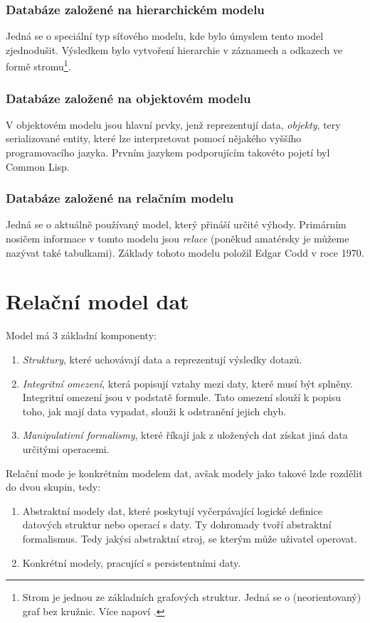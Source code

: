 \subsubsection{Databáze založené na hierarchickém modelu}
Jedná se o speciální typ síťového modelu, kde bylo úmyslem tento model zjednodušit. Výsledkem bylo vytvoření hierarchie v záznamech a odkazech ve formě stromu\footnote{Strom je jednou ze základních grafových struktur. Jedná se o (neorientovaný) graf bez kružnic. Více napoví \citep[str. 91 -- 96]{cormen:algorithms}.}.

\subsubsection{Databáze založené na objektovém modelu}
V objektovém modelu jsou hlavní prvky, jenž reprezentují data, \textit{objekty}, tery serializované entity, které lze interpretovat pomocí nějakého vyššího programovacího jazyka. Prvním jazykem podporujícím takovéto pojetí byl Common Lisp.

\subsubsection{Databáze založené na relačním modelu}
Jedná se o aktuálně používaný model, který přináší určité výhody. Primárním nosičem informace v tomto modelu jsou \textit{relace} (poněkud amatérsky je můžeme nazývat také tabulkami). Základy tohoto modelu položil Edgar Codd v roce 1970.


\section{Relační model dat}
Model má 3 základní komponenty:
\begin{enumerate}
\item \textit{Struktury}, které uchovávají data a reprezentují výsledky dotazů.
\item \textit{Integritní omezení}, která popisují vztahy mezi daty, které musí být splněny. Integritní omezení jsou v podstatě formule. Tato omezení slouží k popisu toho, jak mají data vypadat, slouži k odstranění jejich chyb.
\item \textit{Manipulativní formalismy}, které říkají jak z uložených dat získat jiná data určitými operacemi.
\end{enumerate}
Relační mode je konkrétním modelem dat, avšak modely jako takové lzde rozdělit do dvou skupin, tedy:
\begin{enumerate}
\item Abstraktní modely dat, které poskytují vyčerpávající logické definice datových struktur nebo operací s daty. Ty dohromady tvoří abstraktní formalismus. Tedy jakýsi abstraktní stroj, se kterým může uživatel operovat.
\item Konkrétní modely, pracující s persistentními daty.
\end{enumerate}

